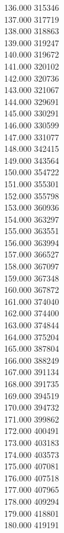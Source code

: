 { 136.000	315346 \\
 137.000	317719 \\
 138.000	318863 \\
 139.000	319247 \\
 140.000	319672 \\
 141.000	320102 \\
 142.000	320736 \\
 143.000	321067 \\
 144.000	329691 \\
 145.000	330291 \\
 146.000	330599 \\
 147.000	331077 \\
 148.000	342415 \\
 149.000	343564 \\
 150.000	354722 \\
 151.000	355301 \\
 152.000	355798 \\
 153.000	360936 \\
 154.000	363297 \\
 155.000	363551 \\
 156.000	363994 \\
 157.000	366527 \\
 158.000	367097 \\
 159.000	367348 \\
 160.000	367872 \\
 161.000	374040 \\
 162.000	374400 \\
 163.000	374844 \\
 164.000	375204 \\
 165.000	387804 \\
 166.000	388249 \\
 167.000	391134 \\
 168.000	391735 \\
 169.000	394519 \\
 170.000	394732 \\
 171.000	399862 \\
 172.000	400491 \\
 173.000	403183 \\
 174.000	403573 \\
 175.000	407081 \\
 176.000	407518 \\
 177.000	407965 \\
 178.000	409294 \\
 179.000	418801 \\
 180.000	419191 \\
}
